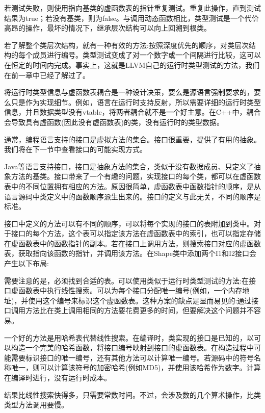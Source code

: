 若测试失败，则使用指向基类的虚函数表的指针重复测试。重复此操作，直到测试结果为true；若没有基类，则为false。与调用动态函数相比，类型测试是一个代价高昂的操作，最坏的情况下，继承层次结构可以向上回溯到根类。

若了解整个类层次结构，就有一种有效的方法:按照深度优先的顺序，对类层次结构的每个成员进行编号。类型测试变成了对一个数字或一个间隔进行比较，这可以在恒定的时间内完成。事实上，这就是LLVM自己的运行时类型测试的方法，我们在前一章中已经了解过了。

将运行时类型信息与虚函数表耦合是一种设计决策，要么是源语言强制要求的，要么只是作为实现细节。例如，语言在运行时支持反射，所以需要详细的运行时类型信息，并且数据类型没有vtable，将两者耦合就不是一个好主意。在C++中，耦合会导致具有虚函数(因此没有虚函数表)的类，没有运行时的类型数据。

通常，编程语言支持的接口是虚拟方法的集合。接口很重要，提供了有用的抽象。我们将在下一节中查看接口的可能实现方式。


Java等语言支持接口，接口是抽象方法的集合，类似于没有数据成员、只定义了抽象方法的基类。接口带来了一个有趣的问题，实现接口的每个类，都可以在虚函数表中的不同位置拥有相应的方法。原因很简单，虚函数表中函数指针的顺序，是从语言源码中类定义中的函数顺序派生出来的。接口的定义与此无关，不同的顺序是标准。

接口中定义的方法可以有不同的顺序，可以将每个实现的接口的表附加到类中。对于接口的每个方法，这个表可以指定该方法在虚函数表中的索引，也可以指定存储在虚函数表中的函数指针的副本。若在接口上调用方法，则搜索接口对应的虚函数表，获取指向该函数的指针，并调用该方法。在Shape类中添加两个I1和I2接口会产生以下布局:


需要注意的是，必须找到合适的表。可以使用类似于运行时类型测试的方法:在接口虚函数表中执行线性搜索。可以为每个接口分配唯一编号(例如，一个内存地址)，并使用这个编号来标识这个虚函数表。这种方案的缺点是显而易见的:通过接口调用方法比在类上调用相同的方法要花费更多的时间，但要解决这个问题并不容易。

一个好的方法是用哈希表代替线性搜索。在编译时，类实现的接口是已知的，以可以构造一个完美的哈希函数，将接口编号映射到接口的虚函数表。在构造过程中可能需要标识接口的唯一编号，还有其他方法可以计算唯一编号。若源码中的符号名称唯一，则可以计算该符号的加密哈希(例如MD5)，并使用该哈希作为数字。计算在编译时进行，没有运行时成本。

结果比线性搜索快得多，只需要常数时间。不过，会涉及数的几个算术操作，比类类型方法调用要慢。

